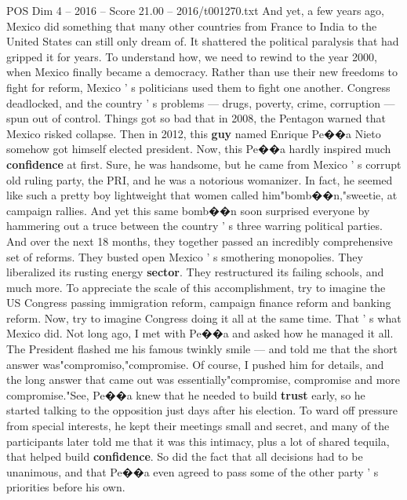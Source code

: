 \begin{textsample}{POS Dim 4 – 2016 – Score 21.00 – 2016/t001270.txt}
And yet, a few years ago, Mexico did something that many other countries from France to India to the United States can still only dream of.
It shattered the political paralysis that had gripped it for years.
To understand how, we need to rewind to the year 2000, when Mexico finally became a democracy.
Rather than use their new freedoms to fight for reform, Mexico ' s politicians used them to fight one another.
Congress deadlocked, and the country ' s problems — drugs, poverty, crime, corruption — spun out of control.
Things got so bad that in 2008, the Pentagon warned that Mexico risked collapse.
Then in 2012, this \textbf{guy} named Enrique Pe{\EmojiFont �}{\EmojiFont �}a Nieto somehow got himself elected president.
Now, this Pe{\EmojiFont �}{\EmojiFont �}a hardly inspired much \textbf{confidence} at first.
Sure, he was handsome, but he came from Mexico ' s corrupt old ruling party, the PRI, and he was a notorious womanizer.
In fact, he seemed like such a pretty boy lightweight that women called him"bomb{\EmojiFont �}{\EmojiFont �}n,"sweetie, at campaign rallies.
And yet this same bomb{\EmojiFont �}{\EmojiFont �}n soon surprised everyone by hammering out a truce between the country ' s three warring political parties.
And over the next 18 months, they together passed an incredibly comprehensive set of reforms.
They busted open Mexico ' s smothering monopolies.
They liberalized its rusting energy \textbf{sector}.
They restructured its failing schools, and much more.
To appreciate the scale of this accomplishment, try to imagine the US Congress passing immigration reform, campaign finance reform and banking reform.
Now, try to imagine Congress doing it all at the same time.
That ' s what Mexico did.
Not long ago, I met with Pe{\EmojiFont �}{\EmojiFont �}a and asked how he managed it all.
The President flashed me his famous twinkly smile — and told me that the short answer was"compromiso,"compromise.
Of course, I pushed him for details, and the long answer that came out was essentially"compromise, compromise and more compromise."See, Pe{\EmojiFont �}{\EmojiFont �}a knew that he needed to build \textbf{trust} early, so he started talking to the opposition just days after his election.
To ward off pressure from special interests, he kept their meetings small and secret, and many of the participants later told me that it was this intimacy, plus a lot of shared tequila, that helped build \textbf{confidence}.
So did the fact that all decisions had to be unanimous, and that Pe{\EmojiFont �}{\EmojiFont �}a even agreed to pass some of the other party ' s priorities before his own.

\end{textsample}
